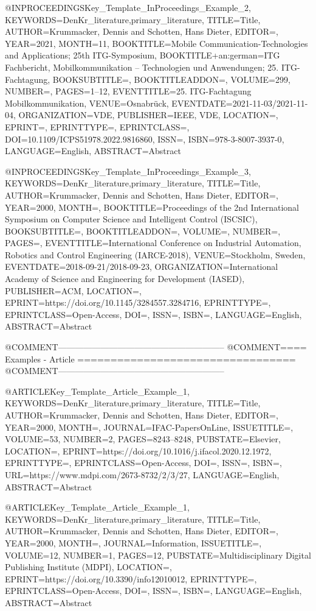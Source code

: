 @INPROCEEDINGS{Key_Template_InProceedings_Example_2,
	KEYWORDS={DenKr_literature,primary_literature},
	TITLE={\begingroup
		{Title}\endgroup},
	AUTHOR={Krummacker, Dennis and Schotten, Hans Dieter},
	EDITOR={},
	YEAR={2021},
	MONTH={11},
	BOOKTITLE={Mobile Communication-Technologies and Applications; 25th ITG-Symposium},
	BOOKTITLE+an:german={ITG Fachbericht, Mobilkommunikation -- Technologien und Anwendungen; 25. ITG-Fachtagung},
	BOOKSUBTITLE={},
	BOOKTITLEADDON={},
	VOLUME={299},
	NUMBER={},
	PAGES={1--12},
	EVENTTITLE={25. ITG-Fachtagung Mobilkommunikation},
	VENUE={Osnabr{\"u}ck},
	EVENTDATE={2021-11-03/2021-11-04},
	ORGANIZATION={VDE},
	PUBLISHER={IEEE, VDE},
	LOCATION={},
	EPRINT={},
	EPRINTTYPE={},
	EPRINTCLASS={},
	DOI={10.1109/ICPS51978.2022.9816860},
	ISSN={},
	ISBN={978-3-8007-3937-0},
	LANGUAGE={English},
	ABSTRACT={\begingroup
		{Abstract}\endgroup}
}

@INPROCEEDINGS{Key_Template_InProceedings_Example_3,
	KEYWORDS={DenKr_literature,primary_literature},
	TITLE={\begingroup
		{Title}\endgroup},
	AUTHOR={Krummacker, Dennis and Schotten, Hans Dieter},
	EDITOR={},
	YEAR={2000},
	MONTH={},
	BOOKTITLE={Proceedings of the 2nd International Symposium on Computer Science and Intelligent Control (ISCSIC)},
	BOOKSUBTITLE={},
	BOOKTITLEADDON={},
	VOLUME={},
	NUMBER={},
	PAGES={},
	EVENTTITLE={International Conference on Industrial Automation, Robotics and Control Engineering (IARCE-2018)},
	VENUE={Stockholm, Sweden},
	EVENTDATE={2018-09-21/2018-09-23},
	ORGANIZATION={International Academy of Science and Engineering for Development (IASED)},
	PUBLISHER={ACM},
	LOCATION={},
	EPRINT={https://doi.org/10.1145/3284557.3284716},
	EPRINTTYPE={},
	EPRINTCLASS={Open-Access},
	DOI={},
	ISSN={},
	ISBN={},
	LANGUAGE={English},
	ABSTRACT={\begingroup
		{Abstract}\endgroup}
}



@COMMENT{-----------------------------------------------------------}
@COMMENT{====  Examples - Article  =================================}
@COMMENT{-----------------------------------------------------------}

@ARTICLE{Key_Template_Article_Example_1,
	KEYWORDS={DenKr_literature,primary_literature},
	TITLE={\begingroup
		{Title}\endgroup},
	AUTHOR={Krummacker, Dennis and Schotten, Hans Dieter},
	EDITOR={},
	YEAR={2000},
	MONTH={},
	JOURNAL={IFAC-PapersOnLine},
	ISSUETITLE={},
	VOLUME={53},
	NUMBER={2},
	PAGES={8243--8248},
	PUBSTATE={Elsevier},
	LOCATION={},
	EPRINT={https://doi.org/10.1016/j.ifacol.2020.12.1972},
	EPRINTTYPE={},
	EPRINTCLASS={Open-Access},
	DOI={},
	ISSN={},
	ISBN={},
	URL={https://www.mdpi.com/2673-8732/2/3/27},
	LANGUAGE={English},
	ABSTRACT={\begingroup
		{Abstract}\endgroup}
}

@ARTICLE{Key_Template_Article_Example_1,
	KEYWORDS={DenKr_literature,primary_literature},
	TITLE={\begingroup
		{Title}\endgroup},
	AUTHOR={Krummacker, Dennis and Schotten, Hans Dieter},
	EDITOR={},
	YEAR={2000},
	MONTH={},
	JOURNAL={Information},
	ISSUETITLE={},
	VOLUME={12},
	NUMBER={1},
	PAGES={12},
	PUBSTATE={Multidisciplinary Digital Publishing Institute (MDPI)},
	LOCATION={},
	EPRINT={https://doi.org/10.3390/info12010012},
	EPRINTTYPE={},
	EPRINTCLASS={Open-Access},
	DOI={},
	ISSN={},
	ISBN={},
	LANGUAGE={English},
	ABSTRACT={\begingroup
		{Abstract}\endgroup}
}